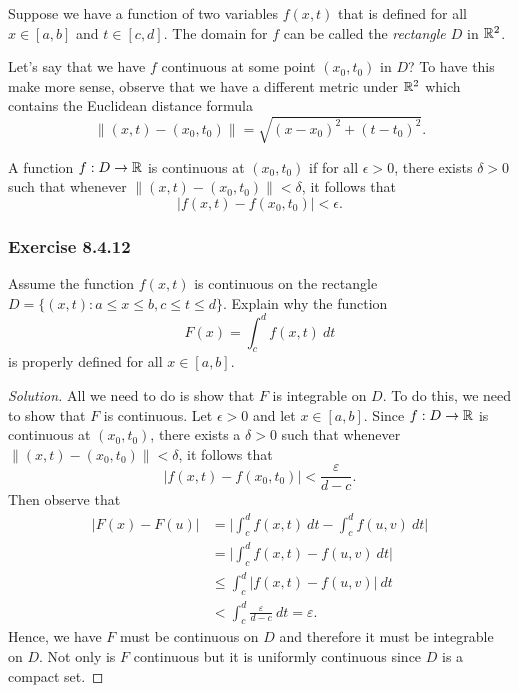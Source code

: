 Suppose we have a function of two variables \( f(x,t)  \) that is defined for all \(  x \in [a,b]  \) and \( t \in [c, d]  \). The domain for  \( f  \) can be called the \textit{rectangle \( D  \)} in \( \mathbb{R}^{2} \). 

Let's say that we have \( f  \) continuous at some point \( (x_{0}, t_{0}) \) in \(  D  \)? To have this make more sense, observe that we have a different metric under \( \mathbb{R}^{2} \) which contains the Euclidean distance formula 
\[  \lVert (x,t) - (x_{0}, t_{0}) \rVert = \sqrt{ (x - x_{0})^{2} + (t - t_{0})^{2}  }. \]

\begin{definition}{}{}
   A function \( f: D \to \mathbb{R}   \)  is continuous at \( (x_{0}, t_{0})  \) if for all \( \epsilon > 0  \), there exists \( \delta > 0  \) such that whenever \( \lVert (x,t) - (x_{0}, t_{0})  \rVert < \delta  \), it follows that 
   \[  | f(x,t) - f(x_{0}, t_{0})  | < \epsilon. \]
\end{definition}

\subsubsection{Exercise 8.4.12} Assume the function \( f(x,t)  \) is continuous on the rectangle \( D = \{ (x,t) : a \leq x \leq b , c \leq t \leq d  \}. \) Explain why the function
\[  F(x) = \int_{ c }^{ d } f(x,t) \ dt \] is properly defined for all \( x \in [a,b]  \).
\begin{proof}[Solution]
    All we need to do is show that \( F \) is integrable on \( D  \). To do this, we need to show that \( F  \) is continuous. Let \( \epsilon > 0  \) and let \( x \in [a,b] \). Since \( f: D \to \mathbb{R}   \) is continuous at \( (x_{0}, t_{0}) \), there exists a \( \delta > 0 \) such that whenever \( \lVert (x,t) - (x_{0}, t_{0}) \rVert <  \delta  \), it follows that 
\[ | f(x,t) - f(x_{0}, t_{0}) | < \frac{ \varepsilon }{  d - c  } .  \] 
Then observe that 
\begin{align*}
    | F(x) - F(u)  | &= \Big| \int_{ c }^{ d } f(x,t) \ dt - \int_{ c }^{ d } f(u,v) \  dt \Big|   \\
                     &= \Big| \int_{ c }^{ d } f(x,t) - f(u,v) \ dt \Big| \\
                     &\leq \int_{ c }^{ d }  | f(x,t) - f(u,v) | \  dt \\
                     &< \int_{ c }^{ d }  \frac{ \varepsilon }{ d -c  } \  dt 
                     = \varepsilon.
\end{align*}
Hence, we have \( F  \) must be continuous on \( D  \) and therefore it must be integrable on \( D  \). Not only is \( F  \) continuous but it is uniformly continuous since \( D  \) is a compact set.
\end{proof}

